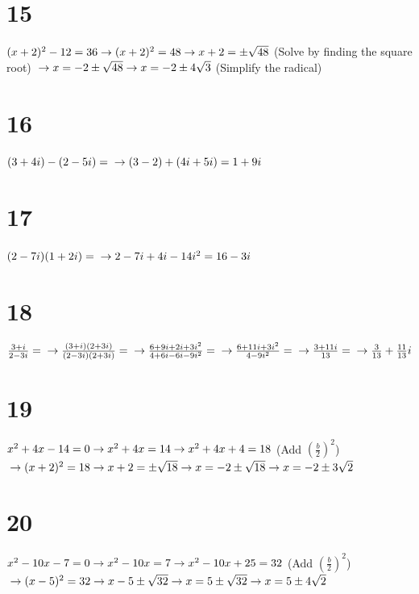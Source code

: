\documentclass{article}
\theoremstyle{definition}
\begin{document}
\section*{15}
$(x+2)^2-12=36\newline\rightarrow 
(x+2)^2=48\newline\rightarrow 
x+2=\pm\sqrt{48}$ (Solve by finding the square root)
$\newline\rightarrow x=-2\pm\sqrt{48}\newline\rightarrow 
x=-2\pm 4\sqrt{3}$ (Simplify the radical)

\section*{16}
$(3+4i)-(2-5i)=\newline\rightarrow 
(3-2)+(4i+5i)=1+9i$

\section*{17}
$(2-7i)(1+2i)=\newline\rightarrow 
2-7i+4i-14i^2=16-3i$

\section*{18}
$\frac{3+i}{2-3i}=\newline\rightarrow 
\frac{(3+i)(2+3i)}{(2-3i)(2+3i)}=\newline\rightarrow 
\frac{6+9i+2i+3i^2}{4+6i-6i-9i^2}=\newline\rightarrow 
\frac{6+11i+3i^2}{4-9i^2}=\newline\rightarrow 
\frac{3+11i}{13}=\newline\rightarrow 
\frac{3}{13}+\frac{11}{13}i$

\section*{19}
$x^2+4x-14=0\newline\rightarrow 
x^2+4x=14\newline\rightarrow 
x^2+4x+4=18$ (Add $(\frac{b}{2})^2$)
$\newline\rightarrow (x+2)^2=18\newline\rightarrow 
x+2=\pm\sqrt{18}\newline\rightarrow 
x=-2\pm\sqrt{18}\newline\rightarrow 
x=-2\pm 3\sqrt{2}$

\section*{20}
$x^2-10x-7=0\newline\rightarrow 
x^2-10x=7\newline\rightarrow 
x^2-10x+25=32$ (Add $(\frac{b}{2})^2$)
$\newline\rightarrow (x-5)^2=32\newline\rightarrow 
x-5\pm\sqrt{32}\newline\rightarrow 
x=5\pm\sqrt{32}\newline\rightarrow 
x=5\pm 4\sqrt{2}$
\end{document}

